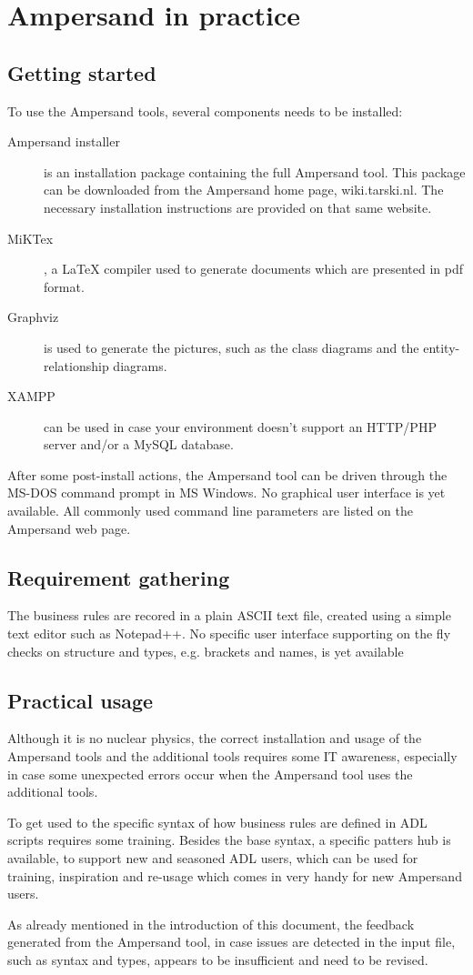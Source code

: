
\section{Ampersand in practice}
\label{sec:InPractice}

\subsection{Getting started}
To use the Ampersand tools, several components needs to be installed:
\begin{description}
	\item[Ampersand installer] is an installation package containing the full Ampersand tool. This package can be downloaded from the Ampersand home page, wiki.tarski.nl. The necessary installation instructions are provided on that same website.
	\item[MiKTex], a LaTeX compiler used to generate documents which are presented in pdf format.
	\item[Graphviz] is used to generate the pictures, such as the class diagrams and the entity-relationship diagrams. 
	\item[XAMPP] can be used in case your environment doesn't support an HTTP/PHP server and/or a MySQL database.
\end{description}

After some post-install actions, the Ampersand tool can be driven through the MS-DOS command prompt in MS Windows. 
No graphical user interface is yet available. All commonly used command line parameters are listed on the Ampersand web page.

\subsection{Requirement gathering}
The business rules are recored in a plain ASCII text file, created using a simple text editor such as Notepad++.
No specific user interface supporting on the fly checks on structure and types, e.g. brackets and names, is yet available 

\subsection{Practical usage}
Although it is no nuclear physics, the correct installation and usage of the Ampersand tools and the additional tools requires some IT awareness, especially in case some unexpected errors occur when the Ampersand tool uses the additional tools. 

To get used to the specific syntax of how business rules are defined in ADL scripts requires some training. 
Besides the base syntax, a specific patters hub is available, to support new and seasoned ADL users,  which can be used for training, inspiration and re-usage which comes in very handy for new Ampersand users.

As already mentioned in the introduction of this document, the feedback generated from the Ampersand tool, in case  issues are detected in the input file, such as syntax and types, appears to be insufficient and need to be revised.